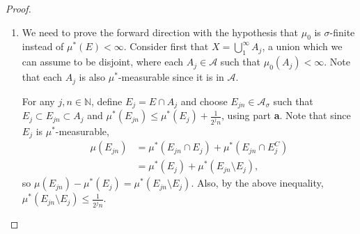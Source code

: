 \documentclass{article}
\theoremstyle{definition}
\begin{document}
\begin{proof}
\begin{enumerate}[label=\textbf{\alph*.}]
		      Conversely, assume there exists $B \in A_{\sigma\delta}$ such that $E \subset B$ and $\mu^*(B \setminus E) = 0$.
		      Since $B$ is a countable intersection of countable unions of elements of $\mathscr{A}$ which are each $\mu^*$-measurable (Proposition 1.3), $B$ is $\mu^*$-measurable.
		      Given $F \subset X$, notice that \begin{align*}
			      \mu^*(F \cap B^C) & = \mu^*(F \cap (B \cup E)^C)                        \\
			                        & = \mu^*(F \cap B^C \cap E^C)                        \\
			                        & = \mu^*(F \cap E^C \cap B^C)                        \\
			                        & = \mu^*(F \cap E^C) - \mu^*(F \cap E^C \cap B)      \\
			                        & = \mu^*(F \cap E^C) - \mu^*(F \cap (B \setminus E)) \\
			                        & = \mu^*(F \cap E^C).
		      \end{align*}
		      Then we get \begin{align*}
			      \mu^*(F) & = \mu^*(F \cap B) + \mu^*(F \cap B^C)     \\
			               & \geq \mu^*(F \cap E) + \mu^*(F \cap E^C),
		      \end{align*}
		      which shows that $E$ is $\mu^*$-measurable.
		\item We need to prove the forward direction with the hypothesis that $\mu_0$ is $\sigma$-finite instead of $\mu^*(E) < \infty$.
		      Consider first that $X = \bigcup_1^\infty A_j$, a union which we can assume to be disjoint, where each $A_j \in \mathscr{A}$ such that $\mu_0(A_j) < \infty$.
		      Note that each $A_j$ is also $\mu^*$-measurable since it is in $\mathscr{A}$.

		      For any $j, n \in \mathbb{N}$, define $E_j = E \cap A_j$ and choose $E_{jn} \in \mathscr{A}_\sigma$ such that $E_j \subset E_{jn} \subset A_j$ and $\mu^*(E_{jn}) \leq \mu^*(E_j) + \frac{1}{2^jn}$, using part \textbf{a}.
		      Note that since $E_j$ is $\mu^*$-measurable, \begin{align*}
			      \mu(E_{jn}) & = \mu^*(E_{jn} \cap E_j) + \mu^*(E_{jn} \cap E_j^C) \\
			                  & = \mu^*(E_j) + \mu^*(E_{jn} \setminus E_j),
		      \end{align*}
		      so $\mu(E_{jn}) - \mu^*(E_j) = \mu^*(E_{jn} \setminus E_j)$. Also, by the above inequality, $\mu^*(E_{jn} \setminus E_j) \leq \frac{1}{2^jn}$.


\end{enumerate}
\end{proof}
\end{document}
